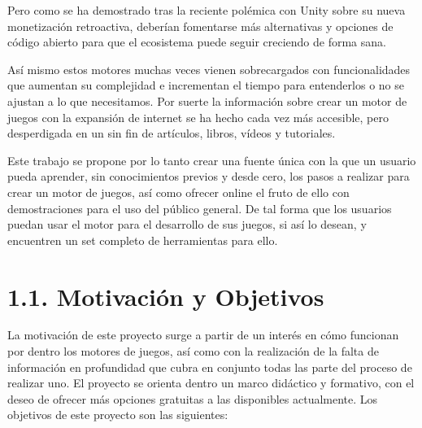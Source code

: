 Pero como se ha demostrado tras la reciente polémica con Unity sobre su nueva monetización retroactiva\cite{unity-polemic},
deberían fomentarse más alternativas y opciones de código abierto para que el ecosistema puede seguir creciendo de forma
sana.

Así mismo estos motores muchas veces vienen sobrecargados con funcionalidades que aumentan su complejidad e incrementan
el tiempo para entenderlos o no se ajustan a lo que necesitamos. Por suerte la información sobre crear un motor de juegos
con la expansión de internet se ha hecho cada vez más accesible, pero desperdigada en un sin fin de artículos, libros,
vídeos y tutoriales.

Este trabajo se propone por lo tanto crear una fuente única con la que un usuario pueda aprender, sin conocimientos previos
y desde cero, los pasos a realizar para crear un motor de juegos, así como ofrecer online el fruto de ello con demostraciones
para el uso del público general. De tal forma que los usuarios puedan usar el motor para el desarrollo de sus juegos, si
así lo desean, y encuentren un set completo de herramientas para ello.

\newpage

\section*{1.1. Motivación y Objetivos}\label{sec:motivation}

La motivación de este proyecto surge a partir de un interés en cómo funcionan por dentro los motores de juegos,
así como con la realización de la falta de información en profundidad que cubra en conjunto todas las parte del proceso
de realizar uno. El proyecto se orienta dentro un marco didáctico y formativo, con el deseo de ofrecer más opciones
gratuitas a las disponibles actualmente. Los objetivos de este proyecto son las siguientes:

